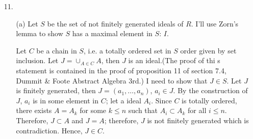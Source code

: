 \documentclass[12pt]{article}
\begin{document}
\begin{enumerate}
\item[11.]\begin{enumerate}
\item[(a)] Let $S$ be the set of not finitely generated ideals of $R$. I'll use Zorn's lemma to show $S$ has a maximal element in $S$: $I$.

Let $C$ be a chain in $S$, i.e. a totally ordered set in $S$ order given by set inclusion. Let $J=\cup_{A\in C} A$, then $J$ is an ideal.(The proof of thi s statement is contained in the proof of proposition 11 of section 7.4, Dummit \& Foote Abstract Algebra 3rd.) I need to show that $J\in S$. Let $J$ is finitely generated, then $J=(a_1, \ldots, a_n)$, $a_i\in J$. By the construction of $J$, $a_i$ is in some element in $C$; let a ideal $A_i$. Since $C$ is totally ordered, there exists $A=A_k$ for some $k\leq n$ such that $A_i\subset A_k$ for all $i\leq n$. Therefore, $J\subset A$ and $J=A$; therefore, $J$ is not finitely generated which is contradiction. Hence, $J\in C$.


\end{enumerate}
\end{enumerate}
\end{document}
